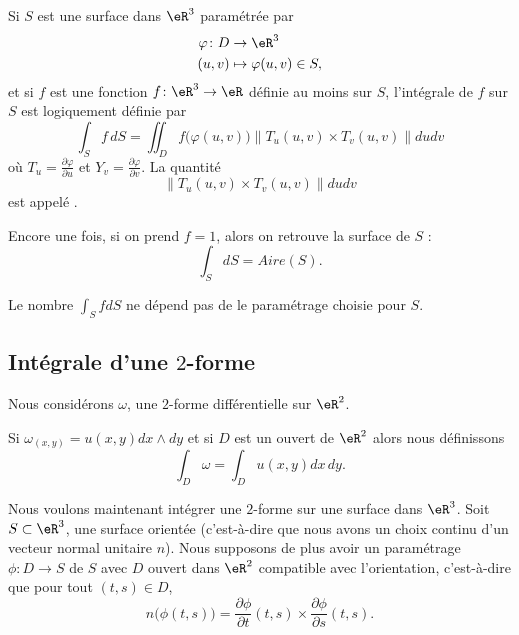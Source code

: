Si $S$ est une surface dans $\eR^3$ paramétrée par
\begin{equation}
	\begin{aligned}
		\varphi\colon D & \to \eR^3                  \\
		(u,v)           & \mapsto \varphi(u,v)\in S,
	\end{aligned}
\end{equation}
et si $f$ est une fonction $f\colon \eR^3\to \eR$ définie au moins sur $S$, l'intégrale de $f$ sur $S$ est logiquement définie par
\begin{equation}
	\int_S f\,dS=\iint_D f\big( \varphi(u,v) \big)\| T_u(u,v)\times T_v(u,v) \|dudv
\end{equation}
où $T_u=\frac{ \partial \varphi }{ \partial u }$ et $Y_v=\frac{ \partial \varphi }{ \partial v }$. La quantité
\begin{equation}
	\| T_u(u,v)\times T_v(u,v) \|dudv
\end{equation}
est appelé .

Encore une fois, si on prend $f=1$, alors on retrouve la surface de $S$ :
\begin{equation}
	\int_SdS=Aire(S).
\end{equation}

\begin{remark}
	Le nombre $\int_SfdS$ ne dépend pas de le paramétrage choisie pour $S$.
\end{remark}


\subsection{Intégrale d'une \( 2\)-forme}

Nous considérons \( \omega\), une \( 2\)-forme différentielle sur \( \eR^2\).
\begin{definition}
	Si \( \omega_{(x,y)}=u(x,y)dx\wedge dy\) et si \( D\) est un ouvert de \( \eR^2\) alors nous définissons
	\begin{equation}
		\int_D\omega=\int_D u(x,y)dx\,dy.
	\end{equation}
\end{definition}

Nous voulons maintenant intégrer une \( 2\)-forme sur une surface dans \( \eR^3\). Soit \( S\subset \eR^3\), une surface orientée (c'est-à-dire que nous avons un choix continu d'un vecteur normal unitaire \( n\)). Nous supposons de plus avoir un paramétrage \( \phi\colon D\to S\) de \( S\) avec \( D\) ouvert dans \( \eR^2\) compatible avec l'orientation, c'est-à-dire que pour tout \( (t,s)\in D\),
\begin{equation}
	n\big( \phi(t,s) \big)=\frac{ \partial \phi }{ \partial t }(t,s)\times \frac{ \partial \phi }{ \partial s }(t,s).
\end{equation}

